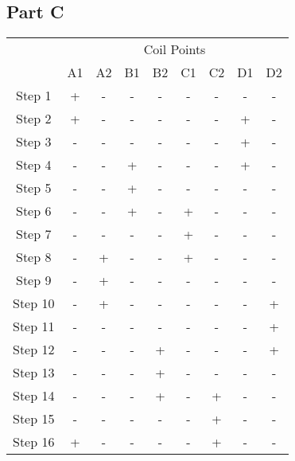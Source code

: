 \documentclass{article}
\begin{document}
	\subsection*{Part C}
		\begin{table}[H]
			\begin{tabular}{c|c|c|c|c|c|c|c|c|}
				\cline{2-9}
				& \multicolumn{8}{|c|}{Coil Points}\\
				\cline{2-9}
				& A1 & A2 & B1 & B2 & C1 & C2 & D1 & D2\\
				\hline
				\multicolumn{1}{|c|}{Step 1} & + & - & - & - & - & - & - & -\\
				\hline
				\multicolumn{1}{|c|}{Step 2} & + & - & - & - & - & - & + & -\\
				\hline
				
				\multicolumn{1}{|c|}{Step 3} & - & - & - & - & - & - & + & -\\
				\hline
				\multicolumn{1}{|c|}{Step 4} & - & - & + & - & - & - & + & -\\
				\hline
				
				
				\multicolumn{1}{|c|}{Step 5} & - & - & + & - & - & - & - & -\\
				\hline
				\multicolumn{1}{|c|}{Step 6} & - & - & + & - & + & - & - & -\\
				\hline
				
				\multicolumn{1}{|c|}{Step 7} & - & - & - & - & + & - & - & -\\
				\hline
				\multicolumn{1}{|c|}{Step 8} & - & + & - & - & + & - & - & -\\
				\hline
				
				\multicolumn{1}{|c|}{Step 9} & - & + & - & - & - & - & - & -\\
				\hline
				\multicolumn{1}{|c|}{Step 10} & - & + & - & - & - & - & - & +\\
				\hline
				
				\multicolumn{1}{|c|}{Step 11} & - & - & - & - & - & - & - & +\\
				\hline
				\multicolumn{1}{|c|}{Step 12} & - & - & - & + & - & - & - & +\\
				\hline
				
				\multicolumn{1}{|c|}{Step 13} & - & - & - & + & - & - & - & -\\
				\hline
				\multicolumn{1}{|c|}{Step 14} & - & - & - & + & - & + & - & -\\
				\hline
				
				\multicolumn{1}{|c|}{Step 15} & - & - & - & - & - & + & - & -\\
				\hline
				\multicolumn{1}{|c|}{Step 16} & + & - & - & - & - & + & - & -\\
				\hline
			\end{tabular}
		\end{table}
\end{document}
